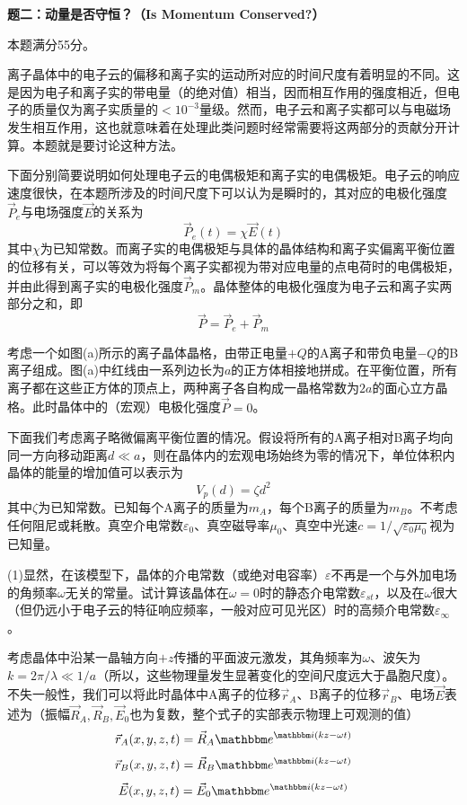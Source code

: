 \documentclass[11pt,a4paper,onecolumn,UTF8]{ctexart}
\begin{document}
	
	
	\noindent
	\textbf{题二：动量是否守恒？（Is Momentum Conserved?）}
	
	本题满分55分。
	
	离子晶体中的电子云的偏移和离子实的运动所对应的时间尺度有着明显的不同。这是因为电子和离子实的带电量（的绝对值）相当，因而相互作用的强度相近，但电子的质量仅为离子实质量的$<10^{-3}$量级。然而，电子云和离子实都可以与电磁场发生相互作用，这也就意味着在处理此类问题时经常需要将这两部分的贡献分开计算。本题就是要讨论这种方法。
	
	下面分别简要说明如何处理电子云的电偶极矩和离子实的电偶极矩。电子云的响应速度很快，在本题所涉及的时间尺度下可以认为是瞬时的，其对应的电极化强度$\vec P_e$与电场强度$\vec E$的关系为
	\begin{equation*}
		\vec{P}_e(t)=\chi\vec E(t)
	\end{equation*}
	其中$\chi$为已知常数。而离子实的电偶极矩与具体的晶体结构和离子实偏离平衡位置的位移有关，可以等效为将每个离子实都视为带对应电量的点电荷时的电偶极矩，并由此得到离子实的电极化强度$\vec P_m$。晶体整体的电极化强度为电子云和离子实两部分之和，即
	\begin{equation*}
		\vec P=\vec P_e+\vec P_m
	\end{equation*}
	
	考虑一个如图(a)所示的离子晶体晶格，由带正电量$+Q$的A离子和带负电量$-Q$的B离子组成。图(a)中红线由一系列边长为$a$的正方体相接地拼成。在平衡位置，所有离子都在这些正方体的顶点上，两种离子各自构成一晶格常数为$2a$的面心立方晶格。此时晶体中的（宏观）电极化强度$\vec P=0$。
	
	下面我们考虑离子略微偏离平衡位置的情况。假设将所有的A离子相对B离子均向同一方向移动距离$d\ll a$，则在晶体内的宏观电场始终为零的情况下，单位体积内晶体的能量的增加值可以表示为
	\begin{equation*}
		V_p(d)=\zeta d^2
	\end{equation*}
	其中$\zeta$为已知常数。已知每个A离子的质量为$m_A$，每个B离子的质量为$m_B$。不考虑任何阻尼或耗散。真空介电常数$\varepsilon_{0}$、真空磁导率$\mu_0$、真空中光速$c=1/\sqrt{\varepsilon_{0}\mu_0}$视为已知量。
	
	(1)显然，在该模型下，晶体的介电常数（或绝对电容率）$\varepsilon$不再是一个与外加电场的角频率$\omega$无关的常量。试计算该晶体在$\omega=0$时的静态介电常数$\varepsilon_{st}$，以及在$\omega$很大（但仍远小于电子云的特征响应频率，一般对应可见光区）时的高频介电常数$\varepsilon_{\infty}$。
	
	考虑晶体中沿某一晶轴方向$+z$传播的平面波元激发，其角频率为$\omega$、波矢为$k=2\pi/\lambda\ll 1/a$（所以，这些物理量发生显著变化的空间尺度远大于晶胞尺度）。不失一般性，我们可以将此时晶体中A离子的位移$\vec{r}_A$、B离子的位移$\vec{r}_B$、电场$\vec E$表述为（振幅$\vec R_A,\vec R_B,\vec E_0$也为复数，整个式子的实部表示物理上可观测的值）
	\begin{equation*}
		\vec r_A(x,y,z,t)=\vec R_A\ue^{\ui(kz-\omega t)}
	\end{equation*}
	\begin{equation*}
		\vec r_B(x,y,z,t)=\vec R_B\ue^{\ui(kz-\omega t)}
	\end{equation*}
	\begin{equation*}
		\vec E(x,y,z,t)=\vec E_0\ue^{\ui(kz-\omega t)}
	\end{equation*}
	
\end{document}
